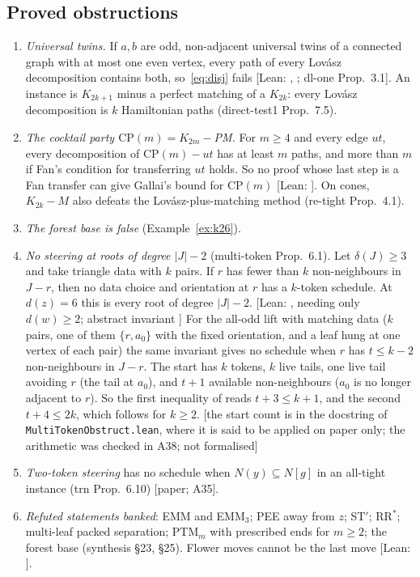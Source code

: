 \documentclass[11pt]{amsart}
\theoremstyle{definition}
\newcommand{\st}[1]{\textsf{\small[#1]}}
\begin{document}
\subsection{Proved obstructions}\label{sec:obstr}
\begin{enumerate}[leftmargin=*]
\item \emph{Universal twins.} If $a,b$ are odd, non-adjacent universal twins of a connected graph with at
most one even vertex, every path of every Lov\'asz decomposition contains both, so~\eqref{eq:disj}
fails \st{Lean: , \lean{not_triangleDisj_of_twins}; dl-one Prop.~3.1}. An
instance is $K_{2k+1}$ minus a perfect matching of a $K_{2k}$: every Lov\'asz decomposition is $k$
Hamiltonian paths (direct-test1 Prop.~7.5).
\item \emph{The cocktail party $\mathrm{CP}(m)=K_{2m}-$PM.} For $m\ge4$ and every edge $ut$, every
decomposition of $\mathrm{CP}(m)-ut$ has at least $m$ paths, and more than $m$ if Fan's condition for
transferring $ut$ holds. So no proof whose last step is a Fan transfer can give Gallai's bound for
$\mathrm{CP}(m)$ \st{Lean: }. On cones, $K_{2k}-M$ also defeats the
Lov\'asz-plus-matching method (re-tight Prop.~4.1).
\item \emph{The forest base is false} (Example~\ref{ex:k26}).
\item \emph{No steering at roots of degree $|J|-2$} (multi-token Prop.~6.1). Let $\delta(J)\ge3$ and take
triangle data with $k$ pairs. If $r$ has fewer than $k$ non-neighbours in $J-r$, then no data choice and
orientation at $r$ has a $k$-token schedule. At $d(z)=6$ this is every root of degree $|J|-2$.
\st{Lean: , needing only $d(w)\ge2$; abstract invariant \lean{not_steerK}}
For the all-odd lift with matching data ($k$ pairs, one of them $\{r,a_0\}$ with the fixed orientation,
and a leaf hung at one vertex of each pair) the same invariant gives no schedule when $r$ has $t\le k-2$
non-neighbours in $J-r$. The start has $k$ tokens, $k$ live tails, one live tail avoiding $r$ (the tail at $a_0$), and $t+1$ available
non-neighbours ($a_0$ is no longer adjacent to $r$). So the first inequality of  reads
$t+3\le k+1$, and the second $t+4\le 2k$, which follows for $k\ge2$. \st{the start count is in the
docstring of \texttt{MultiTokenObstruct.lean}, where it is said to be applied on paper only; the arithmetic
was checked in A38; not formalised}
\item \emph{Two-token steering} has no schedule when $N(y)\subseteq N[g]$ in an all-tight instance (trn
Prop.~6.10) \st{paper; A35}.
\item \emph{Refuted statements banked}: EMM and EMM$_3$; PEE away from $z$; ST$'$; RR$^*$;
multi-leaf packed separation; PTM$_m$ with prescribed ends for $m\ge2$; the forest base
(synthesis \S23, \S25). Flower moves cannot be the last move \st{Lean: }.
\end{enumerate}
\end{document}
